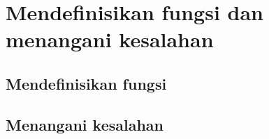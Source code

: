 \chapter{Mendefinisikan fungsi dan menangani kesalahan}
\section{Mendefinisikan fungsi}
\section{Menangani kesalahan}
